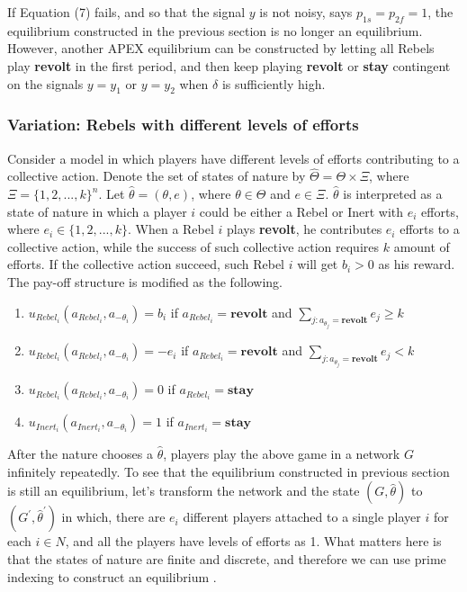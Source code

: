 \documentclass[12pt,letterpaper]{article}
\newtheorem*{main result}{Main Result}
\theoremstyle{definition}
\theoremstyle{remark}
\theoremstyle{claim}
\begin{document}
If Equation (7) fails, and so that the signal $y$ is not noisy, says $p_{1s}=p_{2f}=1$, the equilibrium constructed in the previous section is no longer an equilibrium. However, another APEX equilibrium can be constructed by letting all Rebels play \textbf{revolt} in the first period, and then keep playing \textbf{revolt} or \textbf{stay} contingent on the signals $y=y_1$ or $y=y_2$ when $\delta$ is sufficiently high.

\subsubsection{Variation: Rebels with different levels of efforts}

Consider a model in which players have different levels of efforts contributing to a collective action. Denote the set of states of nature by $\hat{\Theta}=\Theta \times \Xi$, where $\Xi=\{1,2,...,k\}^n$. Let $\hat{\theta}=(\theta,e)$, where $\theta\in \Theta$ and $e\in \Xi$. $\hat{\theta}$ is interpreted as a state of nature in which a player $i$ could be either a Rebel or Inert with $e_i$ efforts, where $e_i\in \{1,2,...,k\}$. When a Rebel $i$ plays \textbf{revolt}, he contributes $e_i$ efforts to a collective action, while the success of such collective action requires $k$ amount of efforts. If the collective action succeed, such Rebel $i$ will get $b_i>0$ as his reward. The pay-off structure is modified as the following.
\begin{enumerate}
\item $u_{Rebel_i}(a_{Rebel_i},a_{-\theta_i})=b_i$ if $a_{Rebel_i}=\textbf{revolt}$ and $\sum_{j:a_{\theta_j}=\textbf{revolt}}e_j\geq k$
\item $u_{Rebel_i}(a_{Rebel_i},a_{-\theta_i})=-e_i$ if $a_{Rebel_i}=\textbf{revolt}$ and $\sum_{j:a_{\theta_j}=\textbf{revolt}}e_j< k$
\item $u_{Rebel_i}(a_{Rebel_i},a_{-\theta_i})=0$ if $a_{Rebel_i}=\textbf{stay}$
\item $u_{Inert_i}(a_{Inert_i},a_{-\theta_i})=1$ if $a_{Inert_i}=\textbf{stay}$
\end{enumerate}

After the nature chooses a $\hat{\theta}$, players play the above game in a network $G$ infinitely repeatedly. To see that the equilibrium constructed in previous section is still an equilibrium, let's transform the network and the state $(G,\hat{\theta})$ to $(G^{'},\hat{\theta}^{'})$ in which, there are $e_i$ different players attached to a single player $i$ for each $i\in N$, and all the players have levels of efforts as 1. What matters here is that the states of nature are finite and discrete, and therefore we can use prime indexing to construct an equilibrium .
\end{document}
